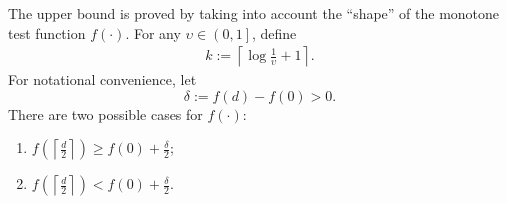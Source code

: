 \documentclass[onecolumn,letterpaper]{IEEEtran}
\newcommand{\fgap}{{\delta}}
\newcommand{\ups}{{\upsilon}}
\newcommand{\logu}{{k}}
\begin{document}
The upper bound is proved by taking into account the ``shape'' of the monotone test function $f(\cdot)$. For any $\ups\in \left(0,1\right]$, define 
\begin{align}
\label{eq:def:k:logu}
    \logu := \left\lceil \log \frac{1}{\ups} +1 \right\rceil.
\end{align}
For notational convenience, let $$\fgap:=f(d)-f(0)>0.$$ There are two possible cases for $f(\cdot)$: 
\begin{enumerate}[label=\roman*)]
    \item $f\left(\left\lceil \frac {d} {2}\right \rceil\right)\geq f(0)+\frac {\fgap}{2}$; \label{f:item:type1}
    \item $f\left(\left\lceil \frac {d} {2}\right \rceil\right) < f(0)+\frac {\fgap}{2}$.   \label{f:item:type2}
\end{enumerate}
\end{document}
